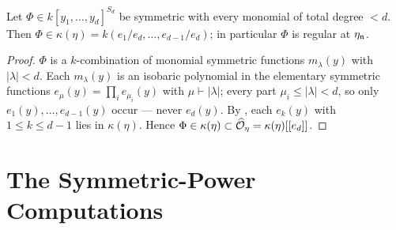 \begin{lemma}\label{lemma:symmetric_regularity}
    Let $\Phi \in k[y_1, \dots, y_d]^{S_d}$ be symmetric with every monomial of total
    degree $< d$. Then $\Phi \in \kappa(\eta) = k(e_1/e_d, \dots, e_{d-1}/e_d)$; in
    particular $\Phi$ is regular at $\eta_{\mathfrak{n}}$.
\end{lemma}

\begin{proof}
    $\Phi$ is a $k$-combination of monomial symmetric functions $m_\lambda(y)$ with
    $|\lambda| < d$. Each $m_\lambda(y)$ is an isobaric polynomial in the elementary
    symmetric functions $e_\mu(y) = \prod_i e_{\mu_i}(y)$ with $\mu \vdash |\lambda|$;
    every part $\mu_i \leq |\lambda| < d$, so only $e_1(y), \dots, e_{d-1}(y)$ occur
    --- never $e_d(y)$. By , each
    $e_k(y)$ with $1 \leq k \leq d-1$ lies in $\kappa(\eta)$. Hence
    $\Phi \in \kappa(\eta) \subset \widehat{\mathcal{O}}_\eta = \kappa(\eta)[[e_d]]$.
\end{proof}


\section{The Symmetric-Power Computations}\label{section:symmetric_power_computations}


